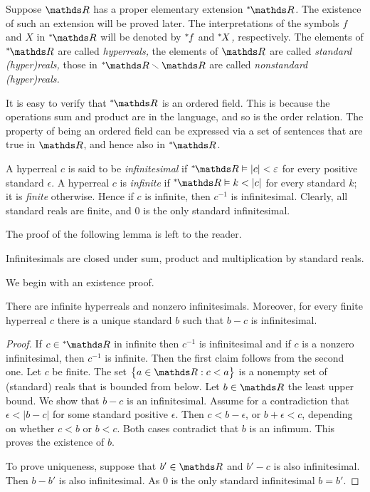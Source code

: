 Suppose $\RR$ has a proper elementary extension \emph{$\nsR$.} The existence of such an extension will be proved later.
The interpretations of the symbols $f$ and $X$ in \emph{$\nsR$} will be denoted by  \emph{${}^*\kern-.2ex f$} and \emph{${}^*\kern-.2ex X$,} respectively.
The elements of $\nsR$ are called \emph{hyperreals,} the elements of $\RR$ are called \emph{standard (hyper)reals,} those in $\nsR\sm\RR$ are called \emph{nonstandard (hyper)reals.}

It is easy to verify that $\nsR$ is an ordered field.
This is because the operations sum and product are in the language, and so is the order relation.
The property of being an ordered field can be expressed via a set of sentences  that are true in $\RR$, and hence also in $\nsR$.

A hyperreal $c$ is said to be \emph{infinitesimal\/} if $\nsR\models|c|<\epsilon$ for every positive standard $\epsilon$.
A hyperreal $c$ is \emph{infinite\/} if $\nsR\models k<|c|$ for every standard $k$; it is \emph{finite\/} otherwise.
Hence if $c$ is infinite, then $c^{-1}$ is infinitesimal.
Clearly, all standard reals are finite, and $0$ is the only standard infinitesimal.

The proof of the following lemma is left to the reader.

\begin{fact}\label{prodottosommainfinitesimi}
  Infinitesimals are closed under sum, product and multiplication by standard reals.
\end{fact}

We begin with an existence proof.

\begin{lemma}\label{lem_esistenzainfinitesimi}
  There are infinite hyperreals and nonzero infinitesimals.
  Moreover, for every finite hyperreal $c$ there is a unique standard $b$ such that $b-c$ is infinitesimal.
\end{lemma}
\begin{proof}
If $c\in\nsR$ in infinite then $c^{-1}$ is infinitesimal and if $c$ is a nonzero infinitesimal, then $c^{-1}$ is infinite.
Then the first claim follows from the second one.
Let $c$ be finite.
The set $\big\{ a\in\RR: c<a\big\}$ is a nonempty set of (standard) reals that is bounded from below.
Let $b\in\RR$ the least upper bound.
We show that $b-c$ is an infinitesimal.
Assume for a contradiction that $\epsilon < |b-c|$ for some standard positive $\epsilon$.
Then $c<b-\epsilon$, or $b+\epsilon< c$, depending on whether $c<b$ or $b<c$.
Both cases contradict that $b$ is an infimum.
This proves the existence of $b$.

To prove uniqueness, suppose that $b'\in\RR$ and $b'-c$ is also infinitesimal.
Then $b-b'$ is also infinitesimal.
As $0$ is the only standard infinitesimal $b=b'$.
\end{proof}

